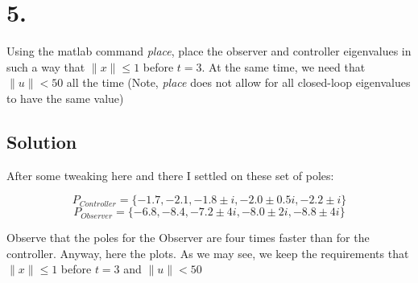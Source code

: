 \documentclass[10pt,a4paper]{article}
\begin{document}
\section*{5.}
Using the matlab command \textit{place}, place the observer and controller eigenvalues in such a way that $ \| x \| \leq 1 $ before $t = 3$. At the same time, we need that $ \| u \| < 50$ all the time (Note, \textit{place} does not allow for all closed-loop eigenvalues to have the same value)

\subsection*{Solution}
After some tweaking here and there I settled on these set of poles:

\[ P_{Controller} = \{-1.7, -2.1, -1.8 \pm i ,-2.0 \pm 0.5i,-2.2 \pm i \} \]
\[ P_{Observer} = \{-6.8, -8.4, -7.2 \pm 4i ,-8.0 \pm 2i,-8.8 \pm 4i \} \]

Observe that the poles for the Observer are four times faster than for the controller. Anyway, here the plots. As we may see, we keep the requirements that  $ \| x \| \leq 1 $ before $t = 3$ and $ \| u \| < 50$
\end{document}
